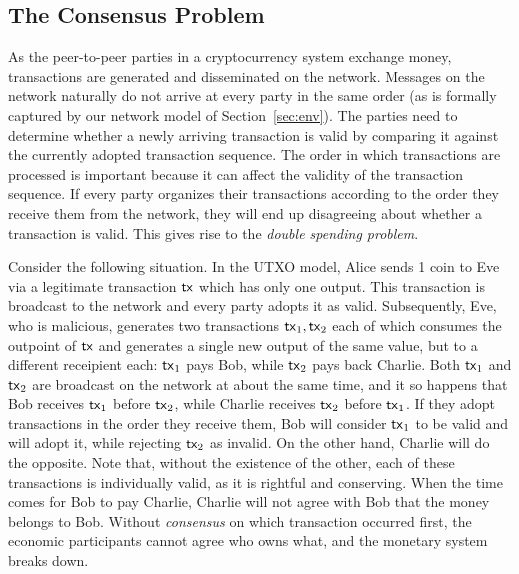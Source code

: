 \subsection{The Consensus Problem}
As the peer-to-peer parties in a cryptocurrency system exchange money,
transactions are generated and disseminated on the network. Messages on the
network naturally do not arrive at every party in the same order (as is
formally captured by our network model of Section~\ref{sec:env}).
The parties need to determine whether a newly arriving transaction is valid by
comparing it against the currently adopted transaction sequence.
The order in which transactions are processed is important because it can affect
the validity of the transaction sequence. If every party organizes their
transactions according to the order they receive them from the network, they
will end up disagreeing about whether a transaction is valid. This gives rise to
the \emph{double spending problem}.

Consider the following situation. In the UTXO model, Alice sends 1 coin to Eve via
a legitimate transaction $\mathsf{tx}$ which has only one output. This transaction is
broadcast to the network and every party adopts it as valid. Subsequently, Eve,
who is malicious,
generates two transactions $\mathsf{tx}_1, \mathsf{tx}_2$ each of which consumes the outpoint of
$\mathsf{tx}$ and generates a single new output of the same value, but to a different
receipient each: $\mathsf{tx}_1$ pays Bob, while $\mathsf{tx}_2$ pays back Charlie. Both
$\mathsf{tx}_1$ and $\mathsf{tx}_2$ are broadcast on the network at about the same time, and it
so happens that Bob receives $\mathsf{tx}_1$ before $\mathsf{tx}_2$, while Charlie receives
$\mathsf{tx}_2$ before $\mathsf{tx}_1$. If they adopt transactions in the order they receive
them, Bob will consider $\mathsf{tx}_1$ to be valid and will adopt it, while rejecting
$\mathsf{tx}_2$ as invalid. On the other hand, Charlie will do the opposite. Note that,
without the existence of the other, each of these transactions is individually
valid, as it is rightful and conserving.
When the time comes for Bob to pay Charlie, Charlie will not agree with Bob that
the money belongs to Bob. Without \emph{consensus} on which transaction occurred
first, the economic participants cannot agree who owns what, and the monetary
system breaks down.

